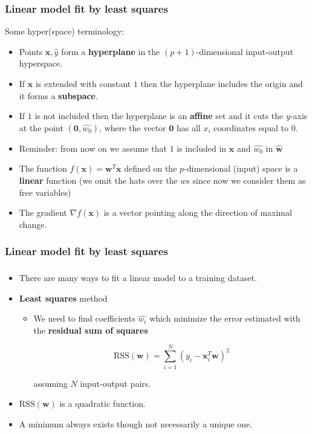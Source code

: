 \documentclass[notes]{beamer}          %
\newcommand{\vect}[1]{\bm{#1}}
\begin{document}
\begin{frame}
\frametitle{Linear model fit by least squares}
    Some hyper(space) terminology:
    \begin{itemize}
        \item Points $\vect{x},\hat{y}$ form a {\bf hyperplane} in the $(p+1)$-dimensional input-output hyperspace.
        \item If $\vect{x}$ is extended with constant $1$ then the hyperplane includes the origin and it forms a {\bf subspace}.
        \item If $1$ is not included then the hyperplane is an {\bf affine} set and it cuts the $y$-axis at the point $(\vect{0}, \hat{w_0})$, where the vector $\vect{0}$ has all $x_i$ coordinates equal to $0$.
        \item Reminder: from now on we assume that $1$ is included in $\vect{x}$ and $\hat{w_0}$ in $\hat{\vect{w}}$
        \item The function $f(\vect{x}) =  \vect{w}^T \vect{x}$ defined on the $p$-dimensional (input) space is a {\bf linear} function (we omit the hats over the $w$s since now we consider them as free variables)
        \item The gradient $\nabla f(\vect{x})$ is a vector pointing along the direction of maximal change.
    \end{itemize}

\end{frame}


\begin{frame}
\frametitle{Linear model fit by least squares}
\frametitle{}
    \begin{itemize}
        \item There are many ways to fit a linear model to a training dataset.
        \item {\bf Least squares} method
            \begin{itemize}
                \item We need to find coefficients $\hat{w_i}$ which minimize the error estimated with the {\bf residual sum of squares}
                \begin{center}
                    $$\mbox{RSS}(\vect{w}) = \sum_{i = 1}^{N}(y_i - \vect{x}_i^T \vect{w})^2$$
                \end{center}
                 assuming $N$ input-output pairs.
            \end{itemize}
        \item $\mbox{RSS}(\vect{w})$ is a quadratic function.
        \item A minimum always exists though not necessarily a unique one.
    \end{itemize}

\end{frame}
\end{document}

